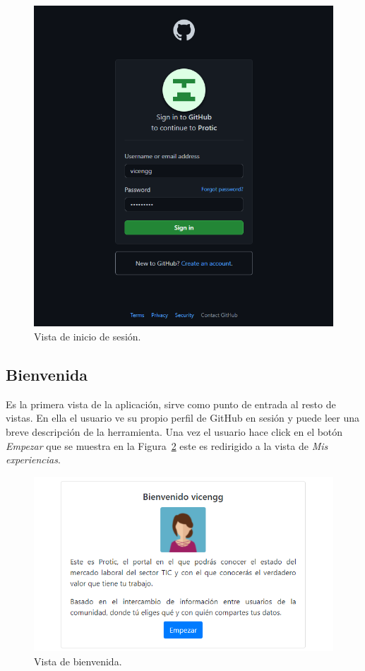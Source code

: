 \documentclass[a4paper, 12pt]{book}
\begin{document}
    \begin{figure}
        \centering
        \includegraphics[width=15cm, keepaspectratio]{img/login.PNG}
        \caption{Vista de inicio de sesión.}\label{fig:view_sign_in}
    \end{figure}

    \subsection{Bienvenida}
    \label{subsec:view_welcome}
    Es la primera vista de la aplicación, sirve como punto de entrada al resto de vistas.
    En ella el usuario ve su propio perfil de GitHub en sesión y puede leer una breve descripción de la herramienta.
    Una vez el usuario hace click en el botón \emph{Empezar} que se muestra en la Figura~\ref{fig:view_welcome} este es redirigido a la vista de \emph{Mis experiencias}.

    \begin{figure}
        \centering
        \includegraphics[width=15cm, keepaspectratio]{img/welcome.PNG}
        \caption{Vista de bienvenida.}\label{fig:view_welcome}
    \end{figure}
\end{document}
